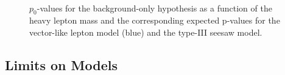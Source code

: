 \begin{figure}[htbp]
	\centering	
	 \\
\caption{$p_0$-values for the background-only hypothesis as a function of the heavy lepton mass and the corresponding expected p-values for the vector-like lepton model (blue) and the type-III seesaw model. }
\label{fig:resonance-p0value-ss}
\end{figure}


\subsection{Limits on Models}

